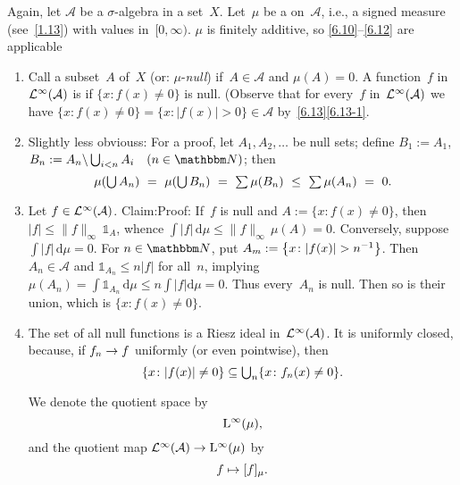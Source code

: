 \documentclass[main.tex]{subfiles}
\begin{document}
\begin{psec}{6.16}%
Again,
let $\mathcal A$ be a $\sigma$-algebra in a set~$X$.
Let~$\mu$ be a  on~$\mathcal A$,
i.e., a signed measure (see~\ref{1.13})
with values in~$[0,\infty)$.
$\mu$ is finitely additive,
so \ref{6.10}--\ref{6.12} are applicable
\begin{enumerate}
\item\label{6.16-1}
Call a subset~$A$ of~$X$  (or: $\mu$-\emph{null})
if~$A\in\mathcal A$ and $\mu(A)=0$.
A function~$f$ in~$\mathcal{L}^\infty(\mathcal A)$ is 
if $\{x\colon f(x)\neq 0\}$ is null.
(Observe that for every~$f$ in~$\mathcal{L}^\infty(\mathcal{A})$
we have
$\{x\colon f(x)\neq 0\}
=\{x\colon |f(x)|>0\}\in\mathcal A$
by~\ref{6.13}\ref{6.13-1}.
%
\item\label{6.16-2}
Slightly less obviouss:
For a proof,
let $A_1,A_2,\dotsc$ be null sets;
define $B_1:=A_1$, 
$B_n:=A_n\backslash \bigcup_{i<n} A_i \quad (n\in\N)$; then
\begin{equation*}
\textstyle \mu(\bigcup A_n)\ 
=\ \mu(\bigcup B_n)\ 
=\ \sum \mu(B_n)\ 
\leq\ \sum \mu(A_n)\ =\ 0\htam{.}
\end{equation*}
%
\item\label{6.16-3}
Let $f\in\mathcal{L}^\infty(\mathcal A)$.
Claim:\statement{
\begin{equation*}
\textstyle f\htam{ is null} \quad\iff\quad \int|f|\,\mathrm{d}\mu=0\htam{.}
\end{equation*}
}Proof:
If~$f$ is null and $A:=\{x\colon f(x)\neq 0\}$,
then $|f|\leq\|f\|_\infty\,\mathbb{1}_A$,
whence $\int|f|\,\mathrm{d}\mu \leq\|f\|_\infty \,\mu(A)=0$.
Conversely,
suppose $\int|f|\,\mathrm{d}\mu=0$.
For $n\in\N$, put
 $A_m:=\smash{\bigl\{x\colon |f(x)|>n^{-1}\bigr\}}$.
Then $A_n\in\mathcal A$ and $\mathbb{1}_{A_n}\leq n|f|$ for all~$n$,
implying
$\mu(A_n) 
= \int \mathbb{1}_{A_n}\,\mathrm{d}\mu
\leq n\int|f|\mathrm{d}\mu =0$.
Thus every~$A_n$ is null.
Then so is their union,
which is $\{x\colon f(x)\neq 0\}$.
%
\item\label{6.16-4}
The set of all null functions
is a Riesz ideal in~$\mathcal{L}^\infty(\mathcal A)$.
It is uniformly closed,
because,
if $f_n\rightarrow f$ uniformly (or even pointwise),
then 
\begin{equation*}
\textstyle \{x\colon |f(x)|\neq 0\} 
\subseteq \bigcup_n \{ x\colon f_n(x)\neq 0\}\text{.}
\end{equation*}

We denote the quotient space by
\begin{equation*}
\mathrm{L}^\infty(\mu)\text{,}
\end{equation*}
and the quotient map $\mathcal{L}^\infty(\mathcal A)\rightarrow\mathrm{L}^\infty(\mu)$ by
\begin{equation*}
f\mapsto [f]_\mu\text{.}
\end{equation*}
\end{enumerate}
\end{psec}
\end{document}
